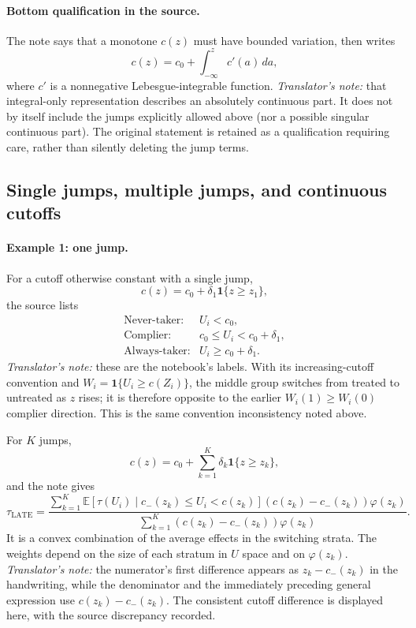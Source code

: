 \paragraph{Bottom qualification in the source.}
The note says that a monotone $c(z)$ must have bounded variation, then writes
\[
 c(z)=c_0+\int_{-\infty}^zc'(a)\,da,
\]
where $c'$ is a nonnegative Lebesgue-integrable function.
\textit{Translator's note:} that integral-only representation describes an absolutely continuous part. It does not by itself include the jumps explicitly allowed above (nor a possible singular continuous part). The original statement is retained as a qualification requiring care, rather than silently deleting the jump terms.

\clearpage
\subsection{Single jumps, multiple jumps, and continuous cutoffs}
\paragraph{Example 1: one jump.}
For a cutoff otherwise constant with a single jump,
\[
 c(z)=c_0+\delta_1\mathbf1\{z\ge z_1\},
\]
the source lists
\[
 \begin{array}{ll}
 \text{Never-taker:}&U_i<c_0,\\
 \text{Complier:}&c_0\le U_i<c_0+\delta_1,\\
 \text{Always-taker:}&U_i\ge c_0+\delta_1.
 \end{array}
\]
\textit{Translator's note:} these are the notebook's labels. With its increasing-cutoff convention and $W_i=\mathbf1\{U_i\ge c(Z_i)\}$, the middle group switches from treated to untreated as $z$ rises; it is therefore opposite to the earlier $W_i(1)\ge W_i(0)$ complier direction. This is the same convention inconsistency noted above.

For $K$ jumps,
\[
 c(z)=c_0+\sum_{k=1}^K\delta_k\mathbf1\{z\ge z_k\},
\]
and the note gives
\[
 \tau_{\mathrm{LATE}}=
 \frac{\displaystyle\sum_{k=1}^K
 \mathbb E[\tau(U_i)\mid c_-(z_k)\le U_i<c(z_k)]
 (c(z_k)-c_-(z_k))\varphi(z_k)}
 {\displaystyle\sum_{k=1}^K(c(z_k)-c_-(z_k))\varphi(z_k)}.
\]
It is a convex combination of the average effects in the switching strata. The weights depend on the size of each stratum in $U$ space and on $\varphi(z_k)$.
\textit{Translator's note:} the numerator's first difference appears as $z_k-c_-(z_k)$ in the handwriting, while the denominator and the immediately preceding general expression use $c(z_k)-c_-(z_k)$. The consistent cutoff difference is displayed here, with the source discrepancy recorded.

